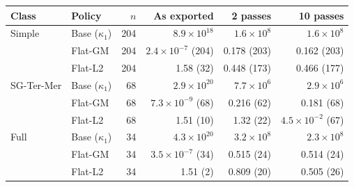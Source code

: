 \begin{tabular}{llrrrr}
\toprule
Class & Policy & $n$ & As exported & 2 passes & 10 passes \\
\midrule
Simple & Base ($\kappa_1$) & 204 & $8.9\times10^{18}$ & $1.6\times10^{8}$ & $1.6\times10^{8}$ \\
 & Flat-GM & 204 & $2.4\times10^{-7}$ (204) & 0.178 (203) & 0.162 (203) \\
 & Flat-L2 & 204 & 1.58 (32) & 0.448 (173) & 0.466 (177) \\
\midrule
SG-Ter-Mer & Base ($\kappa_1$) & 68 & $2.9\times10^{20}$ & $7.7\times10^{6}$ & $2.9\times10^{6}$ \\
 & Flat-GM & 68 & $7.3\times10^{-9}$ (68) & 0.216 (62) & 0.181 (68) \\
 & Flat-L2 & 68 & 1.51 (10) & 1.32 (22) & $4.5\times10^{-2}$ (67) \\
\midrule
Full & Base ($\kappa_1$) & 34 & $4.3\times10^{20}$ & $3.2\times10^{8}$ & $2.3\times10^{8}$ \\
 & Flat-GM & 34 & $3.5\times10^{-7}$ (34) & 0.515 (24) & 0.514 (24) \\
 & Flat-L2 & 34 & 1.51 (2) & 0.809 (20) & 0.505 (26) \\
\bottomrule
\end{tabular}
